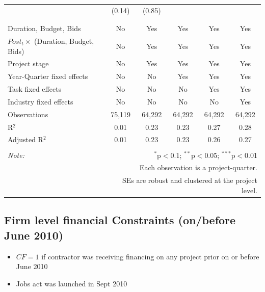 \documentclass[
]{article}
\providecommand{\tightlist}{%
  \setlength{\itemsep}{0pt}\setlength{\parskip}{0pt}}
\begin{document}
\begin{table}[H]
\begin{tabular}{@{\extracolsep{-2pt}}lccccc}
  & (0.14) & (0.85) &  &  &  \\ 
  & & & & & \\ 
\hline \\[-1.8ex] 
Duration, Budget, Bids & No & Yes & Yes & Yes & Yes \\ 
$Post_t \times $  (Duration, Budget, Bids) & No & Yes & Yes & Yes & Yes \\ 
Project stage & No & Yes & Yes & Yes & Yes \\ 
Year-Quarter fixed effects & No & No & Yes & Yes & Yes \\ 
Task fixed effects & No & No & No & Yes & Yes \\ 
Industry fixed effects & No & No & No & No & Yes \\ 
Observations & 75,119 & 64,292 & 64,292 & 64,292 & 64,292 \\ 
R$^{2}$ & 0.01 & 0.23 & 0.23 & 0.27 & 0.28 \\ 
Adjusted R$^{2}$ & 0.01 & 0.23 & 0.23 & 0.26 & 0.27 \\ 
\hline 
\hline \\[-1.8ex] 
\textit{Note:}  & \multicolumn{5}{r}{$^{*}$p$<$0.1; $^{**}$p$<$0.05; $^{***}$p$<$0.01} \\ 
 & \multicolumn{5}{r}{Each observation is a project-quarter.} \\ 
 & \multicolumn{5}{r}{SEs are robust and clustered at the project level.} \\ 
\end{tabular} 
\end{table}

\hypertarget{firm-level-financial-constraints-onbefore-june-2010}{%
\subsection{Firm level financial Constraints (on/before June
2010)}\label{firm-level-financial-constraints-onbefore-june-2010}}

\begin{itemize}
\tightlist
\item
  \(CF=1\) if contractor was receiving financing on any project prior on
  or before June 2010
\item
  Jobs act was launched in Sept 2010
\end{itemize}
\end{document}
